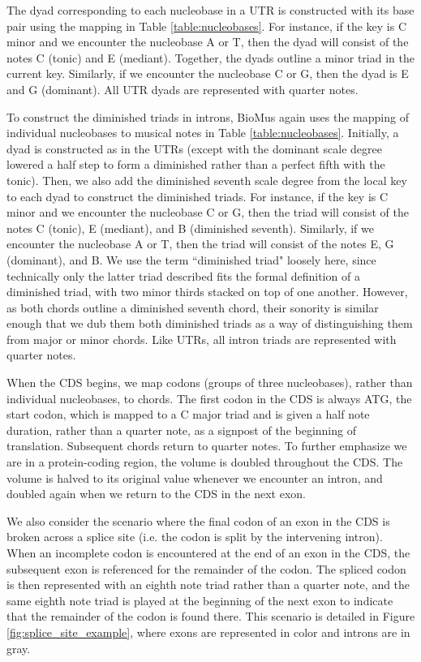 \documentclass[letterpaper]{article}
\begin{document}
The dyad corresponding to each nucleobase in a UTR is constructed with its base pair using the mapping in Table  \ref{table:nucleobases}. For instance, if the key is C minor and we encounter the nucleobase A or T, then the dyad will consist of the notes C (tonic) and E\musFlat \; (mediant). Together, the dyads outline a minor triad in the current key. Similarly, if we encounter the nucleobase C or G, then the dyad is E\musFlat \; and G (dominant). All UTR dyads are represented with quarter notes.

To construct the diminished triads in introns, BioMus again uses the mapping of individual nucleobases to musical notes in Table  \ref{table:nucleobases}. Initially, a dyad is constructed as in the UTRs (except with the dominant scale degree lowered a half step to form a diminished rather than a perfect fifth with the tonic). Then, we also add the diminished seventh scale degree from the local key to each dyad to construct the diminished triads. For instance, if the key is C minor and we encounter the nucleobase C or G, then the triad will consist of the notes C (tonic), E\musFlat \; (mediant), and B\musDoubleFlat\; (diminished seventh). Similarly, if we encounter the nucleobase A or T, then the triad will consist of the notes E\musFlat, G\musFlat \; (dominant), and B\musDoubleFlat. We use the term ``diminished triad" loosely here, since technically only the latter triad described fits the formal definition of a diminished triad, with two minor thirds stacked on top of one another. However, as both chords outline a diminished seventh chord, their sonority is similar enough that we dub them both diminished triads as a way of distinguishing them from major or minor chords. Like UTRs, all intron triads are represented with quarter notes. 

When the CDS begins, we map codons (groups of three nucleobases), rather than individual nucleobases, to chords. The first codon in the CDS is always ATG, the start codon, which is mapped to a C major triad and is given a half note duration, rather than a quarter note, as a signpost of the beginning of translation. Subsequent chords return to quarter notes. To further emphasize we are in a protein-coding region, the volume is doubled throughout the CDS. The volume is halved to its original value whenever we encounter an intron, and doubled again when we return to the CDS in the next exon. 

We also consider the scenario where the final codon of an exon in the CDS is broken across a splice site (i.e. the codon is split by the intervening intron). When an incomplete codon is encountered at the end of an exon in the CDS, the subsequent exon is referenced for the remainder of the codon. The spliced codon is then represented with an eighth note triad rather than a quarter note, and the same eighth note triad is played at the beginning of the next exon to indicate that the remainder of the codon is found there. This scenario is detailed in Figure \ref{fig:splice_site_example}, where exons are represented in color and introns are in gray. 
\end{document}
